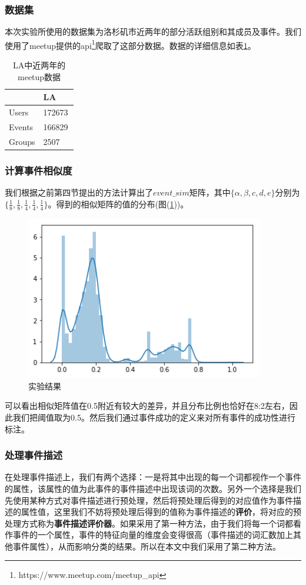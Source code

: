 \documentclass[12pt]{template}
\begin{document}
\subsubsection{数据集}
本次实验所使用的数据集为洛杉矶市近两年的部分活跃组别和其成员及事件。我们使用了meetup提供的api\footnote{https://www.meetup.com/meetup\_api}爬取了这部分数据。数据的详细信息如表\ref{t1-1}。
\begin{table}[htbp] 
  \centering  
  \caption{\label{t1-1}LA中近两年的meetup数据}
    \begin{tabular*}{\linewidth}{p{0.5\linewidth}p{0.5\linewidth}}
\toprule
    & LA \\
\midrule
    Users & 172673\\
    Events & 166829\\
    Groups & 2507\\
\bottomrule
    \end{tabular*}
\end{table}

\subsubsection{计算事件相似度}
我们根据之前第四节提出的方法计算出了\(event\_sim\)矩阵，其中\(\{\alpha,\beta,{c},{d},{e}\}\)分别为\(\{\frac{1}{8},\frac{1}{8},\frac{1}{4},\frac{1}{4},\frac{1}{4}\}\)。得到的相似矩阵的值的分布(图(\ref{f1-1}))。

\begin{figure}[htbp]
  \centering
  \includegraphics[width=10.4cm]{event_sim_dist.png}
  \caption{实验结果}
  \label{f1-1}
\end{figure}

可以看出相似矩阵值在0.5附近有较大的差异，并且分布比例也恰好在8:2左右，因此我们把阈值取为0.5。然后我们通过事件成功的定义来对所有事件的成功性进行标注。

\subsubsection{处理事件描述}
在处理事件描述上，我们有两个选择：一是将其中出现的每一个词都视作一个事件的属性，该属性的值为此事件的事件描述中出现该词的次数。另外一个选择是我们先使用某种方式对事件描述进行预处理，然后将预处理后得到的对应值作为事件描述的属性值，这里我们不妨将预处理后得到的值称为事件描述的\textbf{评价}，将对应的预处理方式称为\textbf{事件描述评价器}。如果采用了第一种方法，由于我们将每一个词都看作事件的一个属性，事件的特征向量的维度会变得很高（事件描述的词汇数加上其他事件属性），从而影响分类的结果。所以在本文中我们采用了第二种方法。
\end{document}
